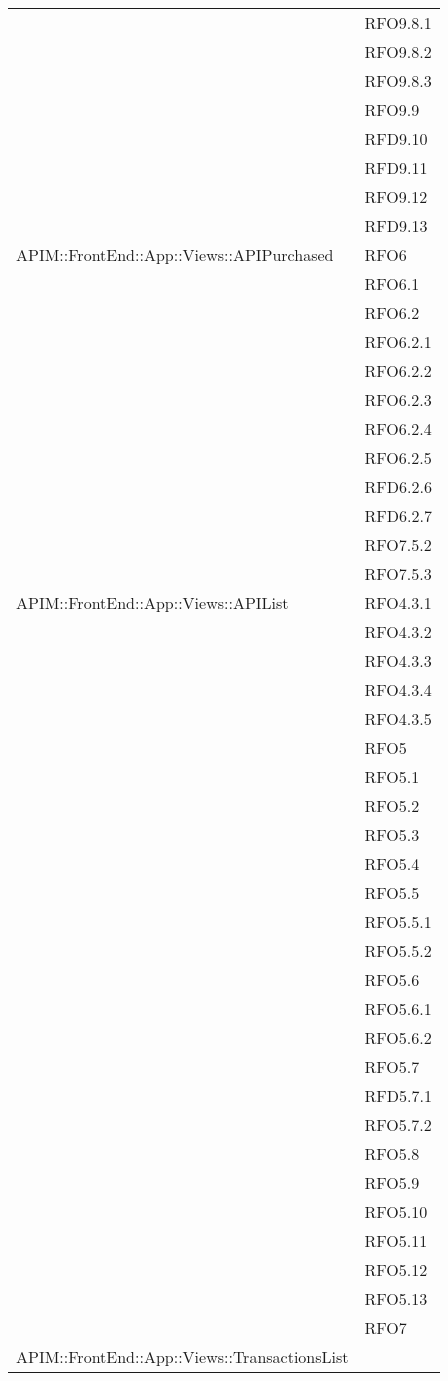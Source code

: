 \begin{longtable}{ p{12cm} | p{4cm} }
	& RFO9.8.1 \\
	& RFO9.8.2 \\
	& RFO9.8.3 \\
	& RFO9.9 \\
	& RFD9.10 \\
	& RFD9.11 \\
	& RFO9.12 \\
	& RFD9.13 \\
	\hline
	APIM::FrontEnd::App::Views::APIPurchased
	& RFO6 \\
	& RFO6.1 \\
	& RFO6.2 \\
	& RFO6.2.1 \\
	& RFO6.2.2 \\
	& RFO6.2.3 \\
	& RFO6.2.4 \\
	& RFO6.2.5 \\
	& RFD6.2.6 \\
	& RFD6.2.7 \\
	& RFO7.5.2 \\
	& RFO7.5.3 \\
	\hline
	APIM::FrontEnd::App::Views::APIList
	& RFO4.3.1 \\
	& RFO4.3.2 \\
	& RFO4.3.3 \\
	& RFO4.3.4 \\
	& RFO4.3.5 \\
	& RFO5 \\
	& RFO5.1 \\
	& RFO5.2 \\
	& RFO5.3 \\
	& RFO5.4 \\
	& RFO5.5 \\
	& RFO5.5.1 \\
	& RFO5.5.2 \\
	& RFO5.6 \\
	& RFO5.6.1 \\
	& RFO5.6.2 \\
	& RFO5.7 \\
	& RFD5.7.1 \\
	& RFO5.7.2 \\
	& RFO5.8 \\
	& RFO5.9 \\
	& RFO5.10 \\
	& RFO5.11 \\
	& RFO5.12 \\
	& RFO5.13 \\
	& RFO7 \\
	\hline
	APIM::FrontEnd::App::Views::TransactionsList

\end{longtable}

